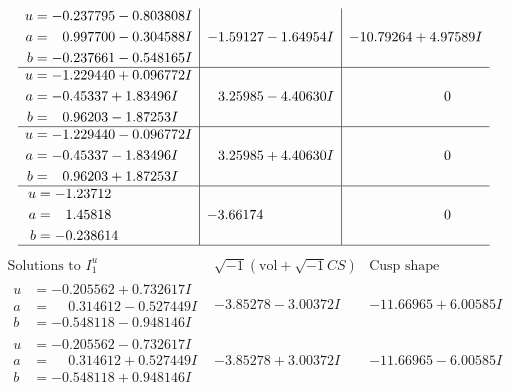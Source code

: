 \documentclass[1p]{elsarticle_modified}
\theoremstyle{definition}
\newcommand{\I}{\sqrt{-1}}
\begin{document}
$$\begin{array}{c|c|c}
\begin{aligned}
u &= -0.237795 - 0.803808 I \\
a &= \phantom{-}0.997700 - 0.304588 I \\
b &= -0.237661 - 0.548165 I\end{aligned}
 & -1.59127 - 1.64954 I & -10.79264 + 4.97589 I \\ \hline\begin{aligned}
u &= -1.229440 + 0.096772 I \\
a &= -0.45337 + 1.83496 I \\
b &= \phantom{-}0.96203 - 1.87253 I\end{aligned}
 & \phantom{-}3.25985 - 4.40630 I & \phantom{-0.000000 } 0 \\ \hline\begin{aligned}
u &= -1.229440 - 0.096772 I \\
a &= -0.45337 - 1.83496 I \\
b &= \phantom{-}0.96203 + 1.87253 I\end{aligned}
 & \phantom{-}3.25985 + 4.40630 I & \phantom{-0.000000 } 0 \\ \hline\begin{aligned}
u &= -1.23712\phantom{ +0.000000I} \\
a &= \phantom{-}1.45818\phantom{ +0.000000I} \\
b &= -0.238614\phantom{ +0.000000I}\end{aligned}
 & -3.66174\phantom{ +0.000000I} & \phantom{-0.000000 } 0\\
 \hline 
 \end{array}$$\newpage$$\begin{array}{c|c|c}  
\text{Solutions to }I^u_{1}& \I (\text{vol} + \sqrt{-1}CS) & \text{Cusp shape}\\
 \hline 
\begin{aligned}
u &= -0.205562 + 0.732617 I \\
a &= \phantom{-}0.314612 - 0.527449 I \\
b &= -0.548118 - 0.948146 I\end{aligned}
 & -3.85278 - 3.00372 I & -11.66965 + 6.00585 I \\ \hline\begin{aligned}
u &= -0.205562 - 0.732617 I \\
a &= \phantom{-}0.314612 + 0.527449 I \\
b &= -0.548118 + 0.948146 I\end{aligned}
 & -3.85278 + 3.00372 I & -11.66965 - 6.00585 I \\ \hline\begin{aligned}

\end{aligned}
\end{array}$$
\end{document}
